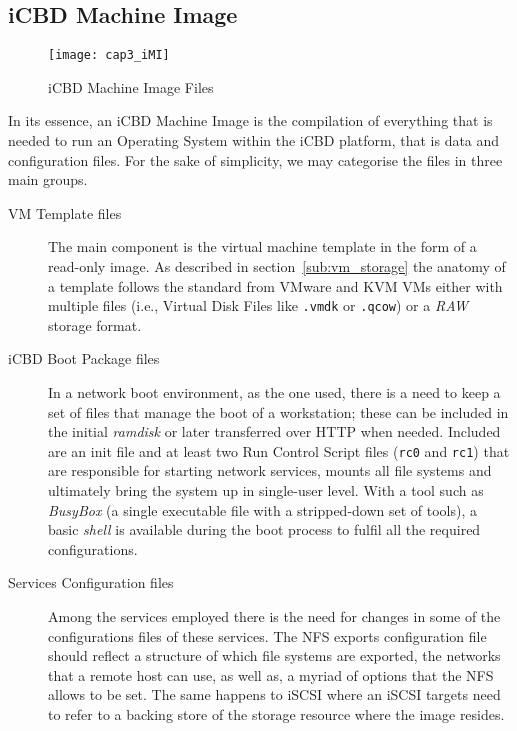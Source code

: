 \subsection{iCBD Machine Image}
\label{sub:icbd_architecture_imi}

\begin{figure}[htbp]
	\centering
	\texttt{[image: cap3\_iMI]}
	\caption{iCBD Machine Image Files}
	\label{fig:icbd_iMI_files}
\end{figure}

In its essence, an iCBD Machine Image is the compilation of everything that is needed to run an Operating System within the iCBD platform, that is data and configuration files. For the sake of simplicity, we may categorise the files in three main groups.

\begin{description}
	\item [VM Template files] The main component is the virtual machine template in the form of a read-only image. As described in section~\ref{sub:vm_storage} the anatomy of a template follows the standard from VMware and KVM VMs either with multiple files (i.e., Virtual Disk Files like \texttt{.vmdk} or \texttt{.qcow}) or a \textit{RAW} storage format.
	\item [iCBD Boot Package files] In a network boot environment, as the one used, there is a need to keep a set of files that manage the boot of a workstation; these can be included in the initial \textit{ramdisk} or later transferred over HTTP when needed. Included are an init file and at least two Run Control Script files (\texttt{rc0} and \texttt{rc1}) that are responsible for starting network services, mounts all file systems and ultimately bring the system up in single-user level. With a tool such as \textit{BusyBox} (a single executable file with a stripped-down set of tools), a basic \textit{shell} is available during the boot process to fulfil all the required configurations.
	\item [Services Configuration files] Among the services employed there is the need for changes in some of the configurations files of these services. The NFS exports configuration file should reflect a structure of which file systems are exported, the networks that a remote host can use, as well as, a myriad of options that the NFS allows to be set. The same happens to iSCSI where an iSCSI targets need to refer to a backing store of the storage resource where the image resides. 
\end{description}

